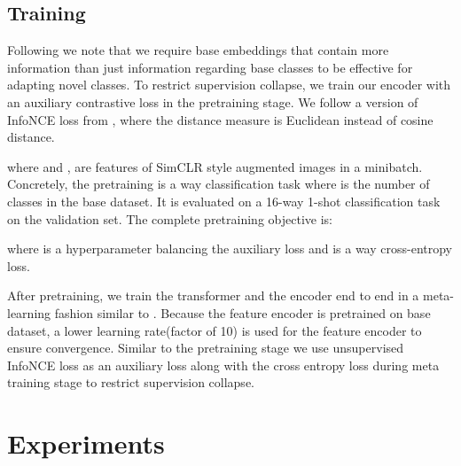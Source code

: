 \documentclass{bmvc2k}
\begin{document}
\subsection{Training} \label{sec:training}
Following \cite{doersch2020crosstransformers,mangla2020charting,liu2021learning} we note that we require base embeddings that contain more information than just information regarding base classes to be effective for adapting novel classes. To restrict supervision collapse, we train our encoder with an auxiliary contrastive loss in the pretraining stage. We follow a version of InfoNCE loss from \cite{chen2018a}, where the distance measure is Euclidean instead of cosine distance. 


where  and ,  are features of SimCLR \cite{chen2020simple} style augmented  images in a minibatch.
Concretely, the pretraining is a  way classification task where  is the number of classes in the base dataset. It is evaluated on a 16-way 1-shot classification task on the validation set. The complete pretraining objective is:

where  is a hyperparameter balancing the auxiliary loss and  is a  way cross-entropy loss.




After pretraining, we train the transformer and the encoder end to end in a meta-learning fashion similar to \cite{ye2020few}. Because the feature encoder is pretrained on base dataset, a lower learning rate(factor of 10) is used for the feature encoder to ensure convergence. Similar to the pretraining stage we  use unsupervised InfoNCE loss as an auxiliary loss along with the cross entropy loss during meta training stage to restrict supervision collapse.
 



\label{sec:blind}

\section{Experiments}
\end{document}
